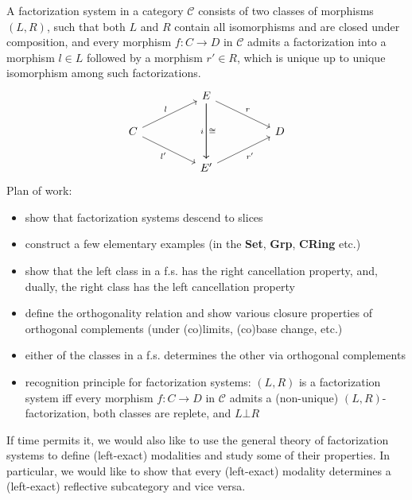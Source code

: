 %

A factorization system in a category $\mathcal{C}$ consists of two classes of morphisms $(L,R)$, such that both $L$ and $R$ contain all isomorphisms and are closed under composition, and every morphism $f: C \to D$ in $\mathcal{C}$ admits a factorization into a morphism $l\in L$ followed by a morphism $r'\in R$, which is unique up to unique isomorphism among such factorizations.
\[\begin{tikzcd}
	&& E \\
	C &&&& D \\
	&& {E'}
	\arrow["r", from=1-3, to=2-5]
	\arrow["i"', from=1-3, to=3-3]
	\arrow["\cong", from=1-3, to=3-3]
	\arrow["l", from=2-1, to=1-3]
	\arrow["{l'}"', from=2-1, to=3-3]
	\arrow["{r'}"', from=3-3, to=2-5]
\end{tikzcd}\]
Plan of work:
\begin{itemize}
    \item show that factorization systems descend to slices
    \item construct a few elementary examples (in the \textbf{Set}, \textbf{Grp}, \textbf{CRing} etc.)
    \item show that the left class in a f.s. has the right cancellation property, and, dually, the right class has the left cancellation property
    \item define the orthogonality relation and show various closure properties of orthogonal complements (under (co)limits, (co)base change, etc.) 
    \item either of the classes in a f.s. determines the other via orthogonal complements
    \item recognition principle for factorization systems: $(L,R)$ is a factorization system iff every morphism $f: C \to D$ in $\mathcal{C}$ admits a (non-unique) $(L,R)$-factorization, both classes are replete, and $L\bot R$
\end{itemize}
If time permits it, we would also like to use the general theory of factorization systems to define (left-exact) modalities and study some of their properties. In particular, we would like to show that every (left-exact) modality determines a (left-exact) reflective subcategory and vice versa.